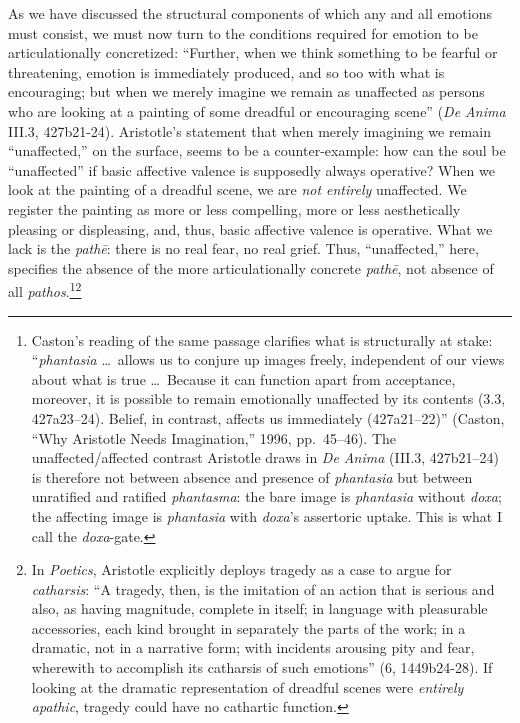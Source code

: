 As we have discussed the structural components of which any and all emotions must consist, we must now turn to the conditions required for emotion to be articulationally concretized: ``Further, when we think something to be fearful or threatening, emotion is immediately produced, and so too with what is encouraging; but when we merely imagine we remain as unaffected as persons who are looking at a painting of some dreadful or encouraging scene'' (\textit{De Anima} III.3, 427b21-24). Aristotle's statement that when merely imagining we remain ``unaffected,'' on the surface, seems to be a counter-example: how can the soul be ``unaffected'' if basic affective valence is supposedly always operative? When we look at the painting of a dreadful scene, we are \textit{not entirely} unaffected. We register the painting as more or less compelling, more or less aesthetically pleasing or displeasing, and, thus, basic affective valence is operative. What we lack is the \textit{pathē}: there is no real fear, no real grief. Thus, ``unaffected,'' here, specifies the absence of the more articulationally concrete \textit{pathē}, not absence of all \textit{pathos}.\footnote{Caston's reading of the same passage clarifies what is structurally at stake: ``\textit{phantasia} \ldots\ allows us to conjure up images freely, independent of our views about what is true \ldots\ Because it can function apart from acceptance, moreover, it is possible to remain emotionally unaffected by its contents (3.3, 427a23--24). Belief, in contrast, affects us immediately (427a21--22)'' (Caston, ``Why Aristotle Needs Imagination,'' 1996, pp.~45--46). The unaffected/affected contrast Aristotle draws in \textit{De Anima} (III.3, 427b21--24) is therefore not between absence and presence of \textit{phantasia} but between unratified and ratified \textit{phantasma}: the bare image is \textit{phantasia} without \textit{doxa}; the affecting image is \textit{phantasia} with \textit{doxa}'s assertoric uptake. This is what I call the \textit{doxa}-gate.}\footnote{In \textit{Poetics}, Aristotle explicitly deploys tragedy as a case to argue for \textit{catharsis}: ``A tragedy, then, is the imitation of an action that is serious and also, as having magnitude, complete in itself; in language with pleasurable accessories, each kind brought in separately the parts of the work; in a dramatic, not in a narrative form; with incidents arousing pity and fear, wherewith to accomplish its catharsis of such emotions'' (6, 1449b24-28). If looking at the dramatic representation of dreadful scenes were \textit{entirely apathic}, tragedy could have no cathartic function.} 

